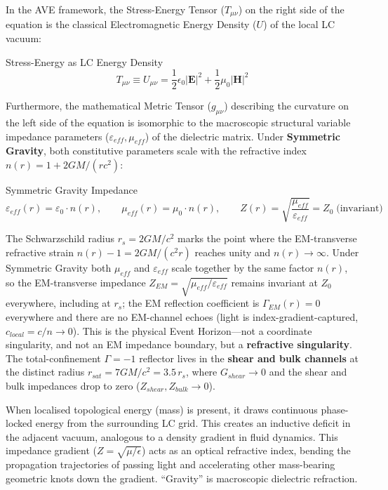 In the AVE framework, the Stress-Energy Tensor ($T_{\mu\nu}$) on the right side of the equation is the classical Electromagnetic Energy Density ($U$) of the local LC vacuum:
\begin{resultbox}{Stress-Energy as LC Energy Density}
\begin{equation}
    T_{\mu\nu} \equiv U_{\mu\nu} = \frac{1}{2}\epsilon_0 |\mathbf{E}|^2 + \frac{1}{2}\mu_0 |\mathbf{H}|^2
\end{equation}
\end{resultbox}

Furthermore, the mathematical Metric Tensor ($g_{\mu\nu}$) describing the curvature on the left side of the equation is isomorphic to the macroscopic structural variable impedance parameters ($\varepsilon_{eff}, \mu_{eff}$) of the dielectric matrix. Under \textbf{Symmetric Gravity}, both constitutive parameters scale with the refractive index $n(r) = 1 + 2GM/(rc^2)$:
\begin{resultbox}{Symmetric Gravity Impedance}
\begin{equation}
    \varepsilon_{eff}(r) = \varepsilon_0 \cdot n(r), \qquad
    \mu_{eff}(r) = \mu_0 \cdot n(r), \qquad
    Z(r) = \sqrt{\frac{\mu_{eff}}{\varepsilon_{eff}}} = Z_0 \;\text{(invariant)}
\end{equation}
\end{resultbox}
The Schwarzschild radius $r_s = 2GM/c^2$ marks the point where the EM-transverse refractive strain $n(r)-1 = 2GM/(c^2 r)$ reaches unity and $n(r) \to \infty$. Under Symmetric Gravity both $\mu_{eff}$ and $\varepsilon_{eff}$ scale together by the same factor $n(r)$, so the EM-transverse impedance $Z_{EM} = \sqrt{\mu_{eff}/\varepsilon_{eff}}$ remains invariant at $Z_0$ everywhere, including at $r_s$; the EM reflection coefficient is $\Gamma_{EM}(r) = 0$ everywhere and there are no EM-channel echoes (light is index-gradient-captured, $c_{local} = c/n \to 0$). This is the physical Event Horizon---not a coordinate singularity, and not an EM impedance boundary, but a \textbf{refractive singularity}. The total-confinement $\Gamma = -1$\gammaundeclared{} reflector lives in the \textbf{shear and bulk channels} at the distinct radius $r_{sat} = 7GM/c^2 = 3.5\,r_s$, where $G_{shear} \to 0$ and the shear and bulk impedances drop to zero ($Z_{shear}, Z_{bulk} \to 0$).

When localised topological energy (mass) is present, it draws continuous phase-locked energy from the surrounding LC grid. This creates an inductive deficit in the adjacent vacuum, analogous to a density gradient in fluid dynamics. This impedance gradient ($Z = \sqrt{\mu/\epsilon}$) acts as an optical refractive index, bending the propagation trajectories of passing light and accelerating other mass-bearing geometric knots down the gradient. ``Gravity'' is macroscopic dielectric refraction.

